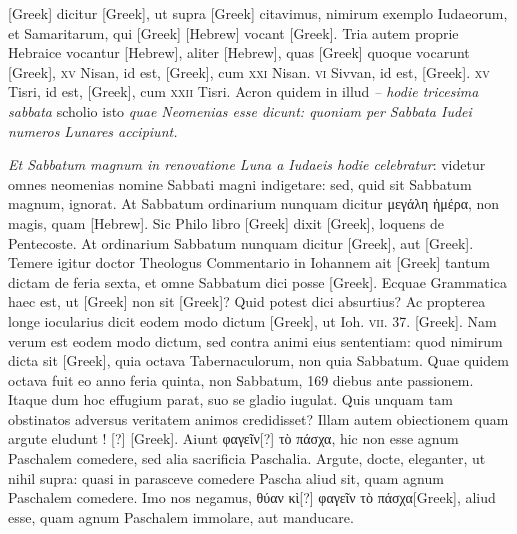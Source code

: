  \textgreek{[Greek]}
dicitur \textgreek{[Greek]}, ut supra \textgreek{[Greek]} citavimus, nimirum
exemplo Iudaeorum, et Samaritarum, qui \textgreek{[Greek]}
\texthebrew{[Hebrew]} vocant \textgreek{[Greek]}.
Tria autem proprie Hebraice vocantur \texthebrew{[Hebrew]},
aliter \texthebrew{[Hebrew]}, quas \textgreek{[Greek]} quoque vocarunt
 \textgreek{[Greek]}, \textsc{xv} Nisan, id est, \textgreek{[Greek]},
 cum \textsc{xxi} Nisan.
\textsc{vi} Sivvan,
id est, \textgreek{[Greek]}.
\textsc{xv} Tisri, id est, \textgreek{[Greek]}, cum
 \textsc{xxii} Tisri.
Acron quidem in illud \textit{– hodie tricesima sabbata} scholio isto
\textit{quae Neomenias esse dicunt: quoniam per Sabbata Iudei numeros Lunares
accipiunt.}

\textit{Et Sabbatum magnum in renovatione Luna a Iudaeis
hodie celebratur}: videtur omnes neomenias nomine Sabbati
magni indigetare: sed, quid sit Sabbatum magnum, ignorat.
At
Sabbatum ordinarium nunquam dicitur \textgreek{μεγάλη ἡμέρα},
 non magis,
quam \texthebrew{[Hebrew]}.
Sic Philo libro \textgreek{[Greek]} dixit \textgreek{[Greek]},
loquens de Pentecoste.
At ordinarium
Sabbatum nunquam dicitur \textgreek{[Greek]}, aut \textgreek{[Greek]}.
Temere igitur
doctor Theologus Commentario in Iohannem ait \textgreek{[Greek]}
tantum dictam de feria sexta, et omne Sabbatum dici posse \textgreek{[Greek]}.
Ecquae Grammatica haec est, ut \textgreek{[Greek]}
non sit \textgreek{[Greek]}?
Quid potest dici absurtius?
Ac propterea
longe iocularius dicit eodem modo dictum \textgreek{[Greek]},
ut Ioh. \textsc{vii}. 37. \textgreek{[Greek]}.
Nam verum est eodem modo dictum, sed
contra animi eius sententiam: quod nimirum dicta sit \textgreek{[Greek]},
quia octava Tabernaculorum, non quia Sabbatum.
Quae quidem
octava fuit eo anno feria quinta, non Sabbatum, 169 diebus ante
passionem.
Itaque dum hoc effugium parat, suo se gladio iugulat.
Quis unquam tam obstinatos adversus veritatem animos credidisset?
Illam autem obiectionem quam argute eludunt ! [?] \textgreek{[Greek]}.
Aiunt \textgreek{φαγεῖν[?] τὸ πάσχα}, hic non esse
agnum Paschalem comedere, sed alia sacrificia Paschalia.
Argute, docte, eleganter, ut nihil supra: quasi in parasceve comedere
Pascha aliud sit, quam agnum Paschalem comedere.
Imo nos negamus, \textgreek{θύαν κὶ[?] φαγεῖν τὸ πάσχα[Greek]},
 aliud esse, quam agnum Paschalem
immolare, aut manducare.

